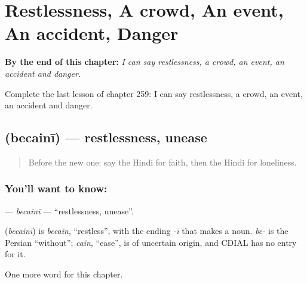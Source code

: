 
\chapter{Restlessness, A crowd, An event, An accident, Danger}
\label{ch:hi-restlessness-a-crowd-an-event-an-accident-danger}

\begin{chapteropening}
\textbf{By the end of this chapter:} \emph{I can say restlessness, a crowd, an event, an accident and danger.}

Complete the last lesson of chapter 259: I can say restlessness, a crowd, an event, an accident and danger.
\end{chapteropening}

\section[\texorpdfstring{\hi{बेचैनी} (becainī)}{बेचैनी (becainī)}]{ (becainī) — restlessness, unease}

\label{lesson:HI-C259-becaini}



\begin{quote}
Before the new one: say the Hindi for faith, then the Hindi for loneliness.
\end{quote}

\subsection*{You'll want to know: }
\textbf{} — \emph{becainī} — \textquotedblleft{}restlessness, unease\textquotedblright{}.

\begin{cousinweb}
\textbf{} (\emph{becainī}) is \emph{becain}, \textquotedblleft{}restless\textquotedblright{}, with the ending \emph{-ī} that makes a noun. \emph{be-} is the Persian \textquotedblleft{}without\textquotedblright{}; \emph{cain}, \textquotedblleft{}ease\textquotedblright{}, is of uncertain origin, and CDIAL has no entry for it.
\end{cousinweb}

\begin{grammarlens}[title={What you've built}]
One more word for this chapter.
\end{grammarlens}

